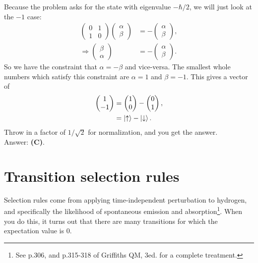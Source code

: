 \documentclass[11pt]{paper}
\newcommand{\answer}[1]{Answer: \textbf{(#1)}.}
\begin{document}
Because the problem asks for the state with eigenvalue $-\hbar/2$, we will just look at the $-1$ case:
\begin{align}
\begin{pmatrix}
0 & 1\\
1 & 0
\end{pmatrix}
\begin{pmatrix}
\alpha\\
\beta
\end{pmatrix}
&= - \begin{pmatrix}
\alpha\\
\beta
\end{pmatrix},\\
\Rightarrow\begin{pmatrix}
\beta\\
\alpha
\end{pmatrix}
&= -\begin{pmatrix}
\alpha\\
\beta
\end{pmatrix}.
\end{align}
So we have the constraint that $\alpha = -\beta$ and vice-versa.  The smallest whole numbers which satisfy this constraint are $\alpha = 1$ and $\beta = -1$.  This gives a vector of
\begin{align}
\begin{pmatrix}
1\\
-1
\end{pmatrix}
 &= \begin{pmatrix}
1\\
0
\end{pmatrix}
-\begin{pmatrix}
0\\
1
\end{pmatrix},\\
&=\ket{\uparrow}-\ket{\downarrow}.
\end{align}
Throw in a factor of $1/\sqrt{2}$ for normalization, and you get the answer.\\

\answer{C}

\section{Transition selection rules}

Selection rules come from applying time-independent perturbation to hydrogen, and specifically the likelihood of spontaneous emission and absorption\footnote{See p.306, and p.315-318 of Griffiths QM, 3ed. for a complete treatment.}.  When you do this, it turns out that there are many transitions for which the expectation value is 0.
\end{document}
